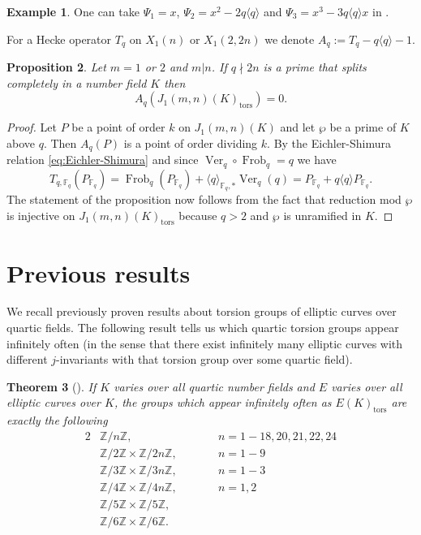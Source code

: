\documentclass[11pt,reqno]{amsart}
\DeclareMathOperator{\Frob}{Frob}
\DeclareMathOperator{\Ver}{Ver}
\newtheorem{theorem}{Theorem}[section]
\newtheorem{proposition}[theorem]{Proposition}
\theoremstyle{definition}
\newtheorem{example}[theorem]{Example}
\numberwithin{equation}{section}
\newcommand{\F}{\mathbb{F}}
\newcommand{\tor}{\mathrm{tors}}
\def\torz#1{\mathbb Z /#1 \mathbb Z}
\def\tg#1#2{\mathbb Z/#1\mathbb Z \times \mathbb Z /#2 \mathbb Z}
\newcommand{\diamondop}[1]{\langle #1 \rangle} %
\begin{document}
\begin{example}
One can take $\Psi_1 =x$, $\Psi_2=x^2-2q\diamondop{q}$ and $\Psi_3=x^3-3q\diamondop{q}x$ in .
\end{example}

For a Hecke operator $T_q$ on $X_1(n)$ or $X_1(2,2n)$ we denote $A_q:=T_q-q\diamondop{q}-1.$
\begin{proposition} \label{prop:kill_tor}
Let $m=1$ or $2$ and $m|n$. If $q\nmid 2n$ is a prime that splits completely in a number field $K$ then
    \begin{equation}\label{eq:kill_tor}
    A_q(J_1(m,n)(K)_{\tor})=0.
\end{equation}
\end{proposition}
\begin{proof}
    Let $P$ be a point of order $k$ on $J_1(m,n)(K)$ and let $\wp$ be a prime of $K$ above $q$. Then $A_q(P)$ is a point of order dividing $k$. By the Eichler-Shimura relation \eqref{eq:Eichler-Shimura} and since $\Ver_q \circ \Frob_q=q$
    we have 
    $$T_{q,\F_q}(P_{\F_q})=\Frob_q(P_{\F_q})+\diamondop{q}_{\F_q,*}\Ver_q(q)=P_{\F_q}+q\diamondop{q} P_{\F_q}.$$
    The statement of the proposition now follows from the fact that reduction mod $\wp$ is injective on $J_1(m,n)(K)_{\tor}$ because $q>2$ and $\wp$ is unramified in $K$.
\end{proof}



\section{Previous results}
We recall previously proven results about torsion groups of elliptic curves over quartic fields. The following result tells us which quartic torsion groups appear infinitely often (in the sense that there exist infinitely many elliptic curves with different $j$-invariants with that torsion group over some quartic field). 

\begin{theorem}[{\cite[Theorem 3.6.]{JeonKimPark06}}]\label{infinite_quartic}
If $K$ varies over all quartic number fields and $E$ varies over
all elliptic curves over $K$, the groups which appear infinitely often as
$E(K)_{\tor}$ are exactly the following
\begin{alignat*}{2}
& \torz{n},  && n=1-18, 20,21,22,24 \\
& \tg{2}{2n}, \quad \quad && n=1-9 \\
& \tg{3}{3n}, \quad && n=1-3 \\
& \tg{4}{4n}, \quad && n=1,2 \\
& \tg{5}{5}, \quad && \\
& \tg{6}{6}. \quad && \\
\end{alignat*}
\end{theorem}
\end{document}
